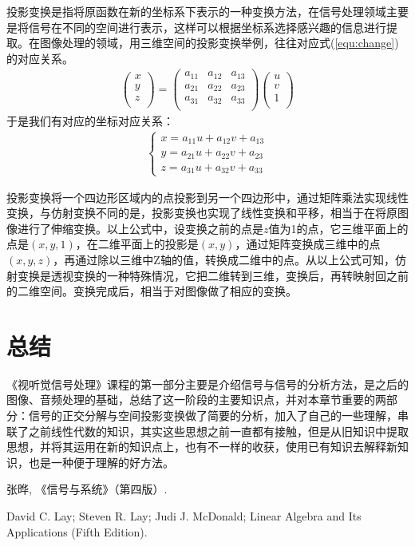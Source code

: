 \documentclass{hitreport}
\begin{document}
投影变换是指将原函数在新的坐标系下表示的一种变换方法，在信号处理领域主要是将信号在不同的空间进行表示，这样可以根据坐标系选择感兴趣的信息进行提取。在图像处理的领域，用三维空间的投影变换举例，往往对应式(\ref{equ:change})的对应关系。
\begin{align}\label{equ:change}
\left( \begin{array}{l}
	x\\
	y\\
	z\\
\end{array} \right) =\left( \begin{matrix}
	a_{11}&		a_{12}&		a_{13}\\
	a_{21}&		a_{22}&		a_{23}\\
	a_{31}&		a_{32}&		a_{33}\\
\end{matrix} \right) \left( \begin{array}{l}
	u\\
	v\\
	1\\
\end{array} \right) 
\end{align}
于是我们有对应的坐标对应关系：
\begin{align}
\left\{ \begin{array}{l}
x = a_{11}u+a_{12}v+a_{13}\\
y = a_{21}u+a_{22}v+a_{23}\\
z = a_{31}u+a_{32}v+a_{33}
\end{array}
\right.
\end{align}

投影变换将一个四边形区域内的点投影到另一个四边形中，通过矩阵乘法实现线性变换，与仿射变换不同的是，投影变换也实现了线性变换和平移，相当于在将原图像进行了伸缩变换。以上公式中，设变换之前的点是$z$值为1的点，它三维平面上的点是$\left(x,y,1\right)$，在二维平面上的投影是$\left(x,y\right)$，通过矩阵变换成三维中的点$\left(x,y,z\right)$，再通过除以三维中Z轴的值，转换成二维中的点。从以上公式可知，仿射变换是透视变换的一种特殊情况，它把二维转到三维，变换后，再转映射回之前的二维空间。变换完成后，相当于对图像做了相应的变换。

\section{总结}

《视听觉信号处理》课程的第一部分主要是介绍信号与信号的分析方法，是之后的图像、音频处理的基础，总结了这一阶段的主要知识点，并对本章节重要的两部分：信号的正交分解与空间投影变换做了简要的分析，加入了自己的一些理解，串联了之前线性代数的知识，其实这些思想之前一直都有接触，但是从旧知识中提取思想，并将其运用在新的知识点上，也有不一样的收获，使用已有知识去解释新知识，也是一种便于理解的好方法。

\renewcommand\refname{参考文献}
 
\begin{thebibliography}{2}
张晔, 《信号与系统》（第四版）.

David C. Lay; Steven R. Lay; Judi J. McDonald; Linear Algebra and Its Applications (Fifth Edition).
\end{thebibliography}
\end{document}
